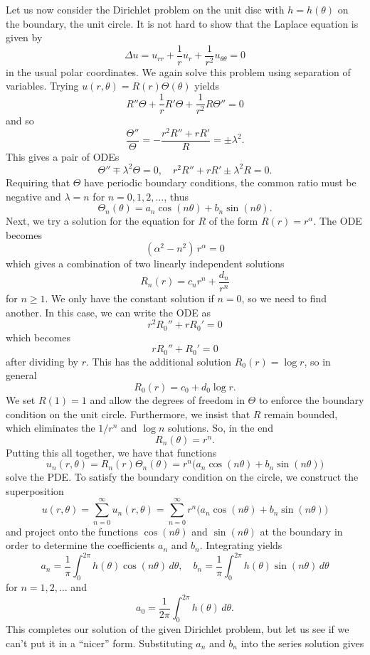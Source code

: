 \begin{example}
Let us now consider the Dirichlet problem on the unit disc with $h = h(\theta)$ on the boundary, the unit circle. It is not hard to show that the Laplace equation is given by
\[\Delta u = u_{rr} + \frac1r u_r + \frac{1}{r^2} u_{\theta\theta} = 0\]
in the usual polar coordinates. We again solve this problem using separation of variables. Trying $u(r,\theta) = R(r)\Theta(\theta)$ yields
\[R''\Theta + \frac{1}{r} R'\Theta + \frac{1}{r^2} R\Theta'' = 0\]
and so
\[\frac{\Theta''}{\Theta} = -\frac{r^2 R'' + r R'}{R} = \pm \lambda^2 .\]
This gives a pair of ODEs
\[\Theta'' \mp \lambda^2 \Theta = 0, \quad r^2 R'' + r R' \pm \lambda^2 R = 0.\]
Requiring that $\Theta$ have periodic boundary conditions, the common ratio must be negative and $\lambda = n$ for $n = 0,1,2,\dots$, thus
\[\Theta_n(\theta) = a_n \cos(n\theta) + b_n \sin(n\theta).\]
Next, we try a solution for the equation for $R$ of the form $R(r) = r^\alpha$. The ODE becomes
\[(\alpha^2 - n^2)\,r^\alpha = 0\]
which gives a combination of two linearly independent solutions
\[R_n(r) = c_n r^n + \frac{d_n}{r^n} \]
for $n \geq 1$. We only have the constant solution if $n = 0$, so we need to find another. In this case, we can write the ODE as
\[r^2 R_0'' + r R_0' = 0\]
which becomes
\[r R_0'' + R_0' = 0\]
after dividing by $r$. This has the additional solution $R_0(r) = \log r$, so in general
\[R_0(r) = c_0 + d_0 \log r.\]
We set $R(1) = 1$ and allow the degrees of freedom in $\Theta$ to enforce the boundary condition on the unit circle. Furthermore, we insist that $R$ remain bounded, which eliminates the $1/r^n$ and $\log n$ solutions. So, in the end
\[R_n(\theta) = r^n .\]
Putting this all together, we have that functions
\[u_n(r,\theta) = R_n(r)\Theta_n(\theta) = r^n\bigl(a_n \cos(n\theta) + b_n \sin(n\theta)\bigr)\]
solve the PDE. To satisfy the boundary condition on the circle, we construct the superposition
\[u(r,\theta) = \sum_{n = 0}^\infty u_n(r,\theta) = \sum_{n = 0}^\infty r^n\bigl(a_n \cos(n\theta) + b_n \sin(n\theta)\bigr)\]
and project onto the functions $\cos(n\theta)$ and $\sin(n\theta)$ at the boundary in order to determine the coefficients $a_n$ and $b_n$. Integrating yields
\[a_n = \frac{1}{\pi} \int_0^{2\pi} h(\theta) \cos(n\theta)\,d\theta ,\quad b_n = \frac{1}{\pi} \int_0^{2\pi} h(\theta) \sin(n\theta)\,d\theta\]
for $n = 1,2,\dots$ and
\[a_0 = \frac{1}{2\pi} \int_0^{2\pi} h(\theta)\,d\theta .\]
This completes our solution of the given Dirichlet problem, but let us see if we can't put it in a ``nicer'' form. Substituting $a_n$ and $b_n$ into the series solution gives

\end{example}
